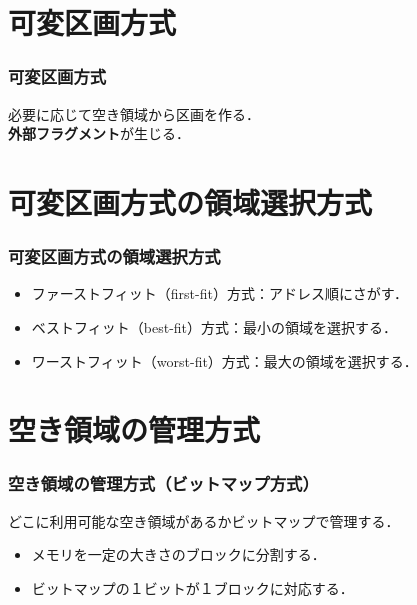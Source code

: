 \documentclass[unicode,handout]{beamer}                   %
\begin{document}
\section{可変区画方式}
\begin{frame}
  \frametitle{可変区画方式}
  \vfill
  必要に応じて空き領域から区画を作る．\\
  {\bf 外部フラグメント}が生じる．
\end{frame}

\section{可変区画方式の領域選択方式}
\begin{frame}
  \frametitle{可変区画方式の領域選択方式}
  \begin{itemize}
  \item ファーストフィット（first-fit）方式：アドレス順にさがす．
  \item ベストフィット（best-fit）方式：最小の領域を選択する．
  \item ワーストフィット（worst-fit）方式：最大の領域を選択する．
  \end{itemize}
\end{frame}

\section{空き領域の管理方式}
\begin{frame}
  \frametitle{空き領域の管理方式（ビットマップ方式）}
  どこに利用可能な空き領域があるかビットマップで管理する．
  \vfill
  \begin{itemize}
  \item メモリを一定の大きさのブロックに分割する．
  \item ビットマップの１ビットが１ブロックに対応する．
  \end{itemize}
\end{frame}
\end{document}
